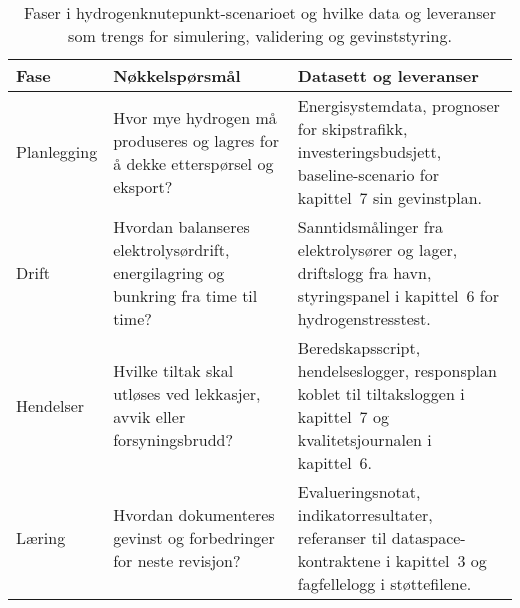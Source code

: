 \begin{table}[htbp]
    \centering
    \begin{tabular}{p{}p{}p{}}
        \toprule
        \textbf{Fase} & \textbf{Nøkkelspørsmål} & \textbf{Datasett og leveranser}\\
        \midrule
        Planlegging & Hvor mye hydrogen må produseres og lagres for å dekke etterspørsel og eksport? & Energisystemdata, prognoser for skipstrafikk, investeringsbudsjett, baseline-scenario for kapittel~7 sin gevinstplan.\\
        Drift & Hvordan balanseres elektrolysørdrift, energilagring og bunkring fra time til time? & Sanntidsmålinger fra elektrolysører og lager, driftslogg fra havn, styringspanel i kapittel~6 for hydrogenstresstest.\\
        Hendelser & Hvilke tiltak skal utløses ved lekkasjer, avvik eller forsyningsbrudd? & Beredskapsscript, hendelseslogger, responsplan koblet til tiltaksloggen i kapittel~7 og kvalitetsjournalen i kapittel~6.\\
        Læring & Hvordan dokumenteres gevinst og forbedringer for neste revisjon? & Evalueringsnotat, indikatorresultater, referanser til dataspace-kontraktene i kapittel~3 og fagfellelogg i støttefilene.\\
        \bottomrule
    \end{tabular}
    \caption{Faser i hydrogenknutepunkt-scenarioet og hvilke data og leveranser som trengs for simulering, validering og gevinststyring.}
    \label{tab:kap04-hydrogen-faser}
\end{table}


